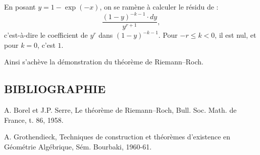 
En
posant \(y=1-\exp(-x)\), on se ramène à calculer le résidu de :
\[
 \frac{(1-y)^{-k-1}\cdot dy}{y^{r+1}},
\]
c'est-à-dire le coefficient de \(y^r\) dans \((1-y)^{-k-1}\). Pour \(-r\leq k<0\), il est nul, et pour \(k=0\), c'est \(1\).

Ainsi s'achève la démonstration du théorème de Riemann--Roch.

\subsection*{BIBLIOGRAPHIE}
\begin{enumerate}[label={[\arabic*]}]
\item A. Borel et J.P. Serre, Le théorème de Riemann--Roch, Bull. Soc. Math. de France, t. 86, 1958.
\item A. Grothendieck, Techniques de construction et théorèmes d'existence en Géométrie Algébrique, Sém. Bourbaki, 1960-61.
\end{enumerate}




